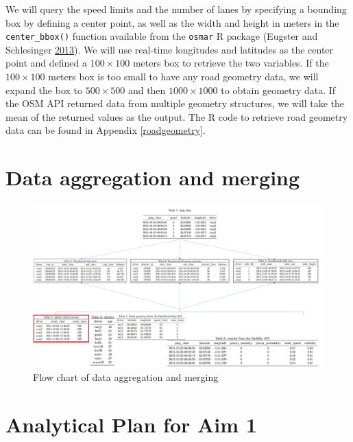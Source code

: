 \documentclass[12pt]{book}
\numberwithin{equation}{chapter}
\begin{document}
We will query the speed limits and the number of lanes by specifying a bounding box by defining a center point, as well as the width and height in meters in the \texttt{center\_bbox()} function available from the \texttt{osmar} R package (Eugster and Schlesinger \protect\hyperlink{ref-eugster2013osmar}{2013}).
We will use real-time longitudes and latitudes as the center point and defined a \(100\times100\) meters box to retrieve the two variables.
If the \(100\times100\) meters box is too small to have any road geometry data, we will expand the box to \(500\times500\) and then \(1000\times1000\) to obtain geometry data.
If the OSM API returned data from multiple geometry structures, we will take the mean of the returned values as the output.
The R code to retrieve road geometry data can be found in Appendix \ref{roadgeometry}.

\hypertarget{data-aggregation-and-merging}{%
\section{Data aggregation and merging}\label{data-aggregation-and-merging}}

\begin{figure}[H]

{\centering \includegraphics[width=\linewidth]{figs/Data_merging} 

}

\caption{Flow chart of data aggregation and merging}\label{fig:unnamed-chunk-1}
\end{figure}

\hypertarget{analytical-plan-for-aim-1}{%
\section{Analytical Plan for Aim 1}\label{analytical-plan-for-aim-1}}
\end{document}
